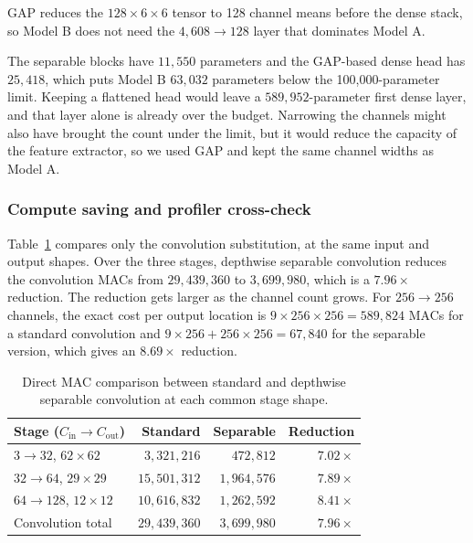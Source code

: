 \documentclass[11pt]{article}
\begin{document}
GAP reduces the $128\times6\times6$ tensor to 128 channel means before the
dense stack, so Model B does not need the $4{,}608\rightarrow128$ layer that
dominates Model A.

The separable blocks have $11{,}550$ parameters and the GAP-based dense head
has $25{,}418$, which puts Model B $63{,}032$ parameters below the
100,000-parameter limit.  Keeping a flattened head would leave a
$589{,}952$-parameter first dense layer, and that layer alone is already over
the budget.  Narrowing the channels might also have brought the count under
the limit, but it would reduce the capacity of the feature extractor, so we
used GAP and kept the same channel widths as Model A.

\subsubsection{Compute saving and profiler cross-check}

Table~\ref{tab:separable-mac-saving} compares only the convolution
substitution, at the same input and output shapes.  Over the three stages,
depthwise separable convolution reduces the convolution MACs from
$29{,}439{,}360$ to $3{,}699{,}980$, which is a $7.96\times$ reduction.  The
reduction gets larger as the channel count grows.  For $256\rightarrow256$
channels, the exact cost per output location is
$9\times256\times256=589{,}824$ MACs for a standard convolution and
$9\times256+256\times256=67{,}840$ for the separable version, which gives an
$8.69\times$ reduction.

\begin{table}[htbp]
  \centering
  \caption{Direct MAC comparison between standard and depthwise separable
  convolution at each common stage shape.}
  \label{tab:separable-mac-saving}
  \begin{tabular}{lrrr}
    \hline
    Stage ($C_{\mathrm{in}}\rightarrow C_{\mathrm{out}}$) & Standard & Separable & Reduction \\
    \hline
    $3\rightarrow32$, $62\times62$ & $3{,}321{,}216$ & $472{,}812$ & $7.02\times$ \\
    $32\rightarrow64$, $29\times29$ & $15{,}501{,}312$ & $1{,}964{,}576$ & $7.89\times$ \\
    $64\rightarrow128$, $12\times12$ & $10{,}616{,}832$ & $1{,}262{,}592$ & $8.41\times$ \\
    \hline
    Convolution total & $29{,}439{,}360$ & $3{,}699{,}980$ & $7.96\times$ \\
    \hline
  \end{tabular}
\end{table}
\end{document}
